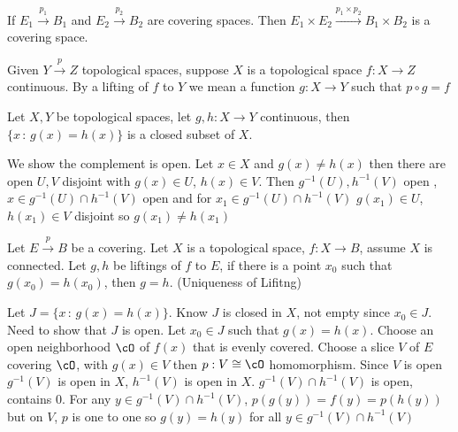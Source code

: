 
\begin{proposition}
    If $E_1 \stackrel{p_1}{\to} B_1$ and $E_2 \stackrel{p_2}{\to} B_2$ are covering spaces. Then $E_1 \times E_2 \stackrel{p_1 \times p_2}{\to} B_1 \times B_2$ is a covering space. 
\end{proposition}

\begin{definition}
    Given $Y \stackrel{p}{\to} Z$ topological spaces, suppose $X$ is a topological space $f: X \to Z$ continuous. By a lifting of $f$ to $Y$ we mean a function $g: X \to Y$ such that $p \circ g = f$ 
\end{definition}

\begin{proposition}
    Let $X, Y$ be topological spaces, let $g, h: X \to Y$ continuous, then $\{x \, : \, g(x)=h(x)\}$ is a closed subset of $X$. 
\end{proposition}

\begin{pf}
    We show the complement is open. Let $x \in X$ and $g(x) \neq h(x)$ then there are open $U,V$ disjoint with $g(x) \in U$, $h(x) \in V$. Then $g^{-1}(U), h^{-1}(V)$ open , $x \in g^{-1}(U) \cap h^{-1}(V)$ open and for $x_1 \in g^{-1}(U) \cap h^{-1}(V)$ $g(x_1) \in U$, $h(x_1) \in V$ disjoint so $g(x_1) \neq h(x_1)$
\end{pf}


\begin{proposition}
    Let $E \stackrel{p}{\to} B$ be a covering. Let $X$ is a topological space, $f: X \to B$, assume $X$ is connected. Let $g,h$ be liftings of $f$ to $E$, if there is a point $x_0$ such that $g(x_0)=h(x_0)$, then $g=h$. (Uniqueness of Lifitng) 
\end{proposition}

\begin{pf}
    Let $J = \{x \, : \, g(x)=h(x)\}$. Know $J$ is closed in $X$, not empty since $x_0 \in J$. Need to show that $J$ is open. Let $x_0 \in J$ such that $g(x) = h(x)$. Choose an open neighborhood $\cO$ of $f(x)$ that is evenly covered. Choose a slice $V$ of $E$ covering $\cO$, with $g(x) \in V$ then $p: V \cong \cO$ homomorphism. Since $V$ is open $g^{-1}(V)$ is open in $X$, $h^{-1}(V)$ is open in $X$. $g^{-1}(V) \cap h^{-1}(V)$ is open, contains 0. For any $y \in g^{-1}(V) \cap h^{-1}(V)$, $p(g(y)) = f(y) = p(h(y))$ but on $V$, $p$ is one to one so $g(y)=h(y)$ for all $y \in g^{-1}(V) \cap h^{-1}(V)$ 
\end{pf}